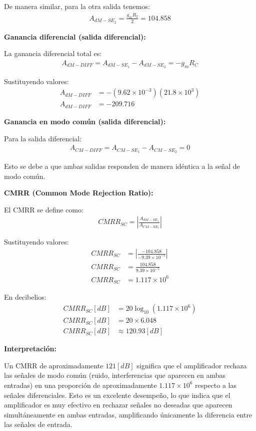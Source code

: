\documentclass[
  11pt,
  letterpaper,
   addpoints,
   answers
  ]{exam}
\begin{document}
\begin{questions}
\begin{parts}
\begin{solution}
De manera similar, para la otra salida tenemos:
\begin{align}
  A_{dM-SE_2} = \frac{g_m R_2}{2} = 104.858
\end{align}

\textbf{Ganancia diferencial (salida diferencial):}

La ganancia diferencial total es:
\begin{align}
  A_{dM-DIFF} = A_{dM-SE_1} - A_{dM-SE_2} = -g_m R_C
\end{align}

Sustituyendo valores:
\begin{align}
  A_{dM-DIFF} &= -(9.62 \times 10^{-3})(21.8 \times 10^3)\\
  A_{dM-DIFF} &= -209.716
\end{align}

\textbf{Ganancia en modo común (salida diferencial):}

Para la salida diferencial:
\begin{align}
  A_{CM-DIFF} = A_{CM-SE_1} - A_{CM-SE_2} = 0
\end{align}

Esto se debe a que ambas salidas responden de manera idéntica a la señal de modo común.

\textbf{CMRR (Common Mode Rejection Ratio):}

El CMRR se define como:
\begin{align}
  CMRR_{SC} = \left|\frac{A_{dM-SE_1}}{A_{CM-SE_1}}\right|
\end{align}

Sustituyendo valores:
\begin{align}
  CMRR_{SC} &= \left|\frac{-104.858}{-9.39 \times 10^{-5}}\right|\\
  CMRR_{SC} &= \frac{104.858}{9.39 \times 10^{-5}}\\
  CMRR_{SC} &= 1.117 \times 10^6
\end{align}

En decibelios:
\begin{align}
  CMRR_{SC}[dB] &= 20\log_{10}(1.117 \times 10^6)\\
  CMRR_{SC}[dB] &= 20 \times 6.048\\
  CMRR_{SC}[dB] &\approx 120.93[dB]
\end{align}

\textbf{Interpretación:}

Un CMRR de aproximadamente $121[dB]$ significa que el amplificador rechaza las señales de modo común (ruido, interferencias que aparecen en ambas entradas) en una proporción de aproximadamente $1.117 \times 10^6$ respecto a las señales diferenciales. Esto es un excelente desempeño, lo que indica que el amplificador es muy efectivo en rechazar señales no deseadas que aparecen simultáneamente en ambas entradas, amplificando únicamente la diferencia entre las señales de entrada.


\end{solution}
\end{parts}
\end{questions}
\end{document}
